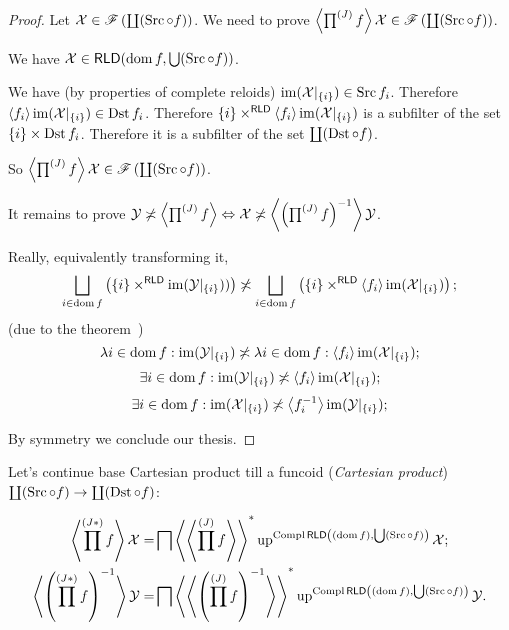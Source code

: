 \begin{proof}
Let $\mathcal{X}\in\mathscr{F}\left(\coprod(\operatorname{Src}\circ f)\right)$.
We need to prove
$\left\langle \prod^{(J)}f\right\rangle \mathcal{X}\in\mathscr{F}\left(\coprod(\operatorname{Src}\circ f)\right)$.

We have $\mathcal{X}\in\mathsf{RLD}(\operatorname{dom} f, \bigcup(\operatorname{Src}\circ f))$.

We have (by properties of complete reloids) $\operatorname{im}(\mathcal{X}|_{\{i\}})\in\operatorname{Src} f_i$. Therefore $\left\langle f_i\right\rangle\operatorname{im}(\mathcal{X}|_{\{i\}})\in\operatorname{Dst} f_i$. Therefore
$\{i\}\times^{\mathsf{RLD}}\left\langle f_i\right\rangle\operatorname{im}(\mathcal{X}|_{\{i\}})$ is a subfilter of the set $\{i\}\times\operatorname{Dst} f_i$. Therefore it is a subfilter of the set $\coprod(\operatorname{Dst}\circ f)$.

So $\left\langle \prod^{(J)}f\right\rangle \mathcal{X}\in\mathscr{F}\left(\coprod(\operatorname{Src}\circ f)\right)$.

It remains to prove
$\mathcal{Y}\not\asymp\left\langle \prod^{(J)}f\right\rangle \Leftrightarrow
\mathcal{X}\not\asymp\left\langle \left(\prod^{(J)}f\right)^{-1}\right\rangle \mathcal{Y}$.

Really, equivalently transforming it, \[ \bigsqcup_{i\in\dom f}
\left(\{i\}\times^{\mathsf{RLD}}\im(\mathcal{Y}|_{\{i\}}))\right) \nasymp \bigsqcup_{i\in\dom f}
\left(\{i\}\times^{\mathsf{RLD}}\supfun{f_i}\im(\mathcal{X}|_{\{i\}})\right); \]
(due to the theorem~)
\[
\lambda i\in\operatorname{dom} f:\operatorname{im}(\mathcal{Y}|_{\{i\}}) \not\asymp
\lambda i\in\operatorname{dom} f:\left\langle f_i\right\rangle\operatorname{im}(\mathcal{X}|_{\{i\}});
\]
\[
\exists i\in\operatorname{dom} f:\operatorname{im}(\mathcal{Y}|_{\{i\}}) \not\asymp
\left\langle f_i\right\rangle\operatorname{im}(\mathcal{X}|_{\{i\}});
\]
\[
\exists i\in\operatorname{dom} f:\operatorname{im}(\mathcal{X}|_{\{i\}}) \not\asymp
\left\langle f_i^{-1}\right\rangle\operatorname{im}(\mathcal{Y}|_{\{i\}});
\]

By symmetry we conclude our thesis.
\end{proof}

\begin{defn}
Let's continue base Cartesian product till
a funcoid (\emph{Cartesian product}) $\coprod(\operatorname{Src}\circ f)\to\coprod(\operatorname{Dst}\circ f)$:
\end{defn}

\begin{align*}
\left\langle \prod^{(J\ast)} f\right\rangle\mathcal{X} =&
\bigsqcap\left\langle \left\langle \prod^{(J)}f\right\rangle\right\rangle ^{\ast}\operatorname{up}^{\operatorname{Compl}\mathsf{RLD}\left((\operatorname{dom} f),\bigcup(\operatorname{Src}\circ f)\right)}\mathcal{X};\\
\left\langle \left(\prod^{(J\ast)} f\right)^{-1}\right\rangle\mathcal{Y} =&
\bigsqcap\left\langle \left\langle \left(\prod^{(J)}f\right)^{-1}\right\rangle\right\rangle ^{\ast}\operatorname{up}^{\operatorname{Compl}\mathsf{RLD}\left((\operatorname{dom} f),\bigcup(\operatorname{Src}\circ f)\right)}\mathcal{Y}.
\end{align*}


